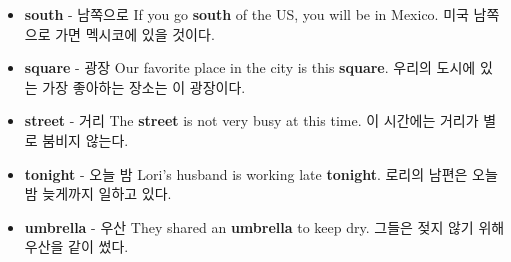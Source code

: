 \documentclass{article}
\begin{document}
\begin{addmargin}[1em]{1em}
\begin{itemize}
        \item \fontsize{12pt}{14pt}\selectfont \textbf{south} - 남쪽으로 \newline
        If you go \textbf{south} of the US, you will be in Mexico. \newline
        미국 남쪽으로 가면 멕시코에 있을 것이다.

        \item \fontsize{12pt}{14pt}\selectfont \textbf{square} - 광장 \newline
        Our favorite place in the city is this \textbf{square}. \newline
        우리의 도시에 있는 가장 좋아하는 장소는 이 광장이다.
        
        \item \fontsize{12pt}{14pt}\selectfont \textbf{street} - 거리 \newline
        The \textbf{street} is not very busy at this time. \newline
        이 시간에는 거리가 별로 붐비지 않는다.

        \item \fontsize{12pt}{14pt}\selectfont \textbf{tonight} - 오늘 밤 \newline
        Lori's husband is working late \textbf{tonight}. \newline
        로리의 남편은 오늘 밤 늦게까지 일하고 있다.

        \item \fontsize{12pt}{14pt}\selectfont \textbf{umbrella} - 우산 \newline
        They shared an \textbf{umbrella} to keep dry. \newline
        그들은 젖지 않기 위해 우산을 같이 썼다.
    \end{itemize}
\end{addmargin}
\end{document}
